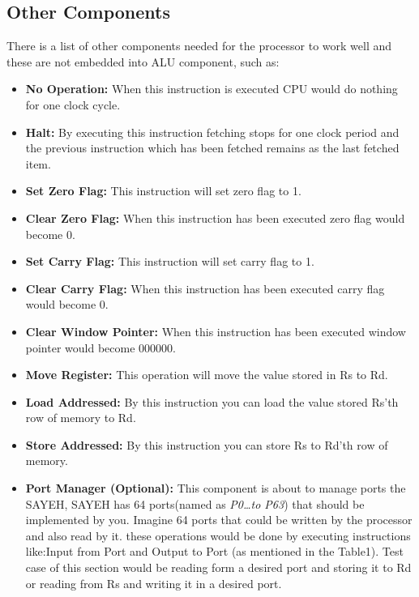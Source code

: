 \documentclass{report}
\begin{document}
    \subsection{Other Components}
        There is a list of other components needed for the processor to work well and these 		are not embedded into ALU component, such as:
        \begin{itemize}
            \item \textbf{No Operation:}
                When this instruction is executed CPU would do nothing for one clock cycle.
            \item \textbf{Halt:}
                By executing this instruction fetching stops for one clock period and the 				previous instruction which has been fetched remains as the last fetched item.
            \item \textbf{Set Zero Flag:}
                This instruction will set zero flag to 1.
            \item \textbf{Clear Zero Flag:}
                When this instruction has been executed zero flag would become 0.
            \item \textbf{Set Carry Flag:}
                This instruction will set carry flag to 1.
            \item \textbf{Clear Carry Flag:}
                When this instruction has been executed carry flag would become 0.
            \item \textbf{Clear Window Pointer:}
                When this instruction has been executed window pointer would become 000000.
            \item \textbf{Move Register:}
                This operation will move the value stored in Rs to Rd.
            \item \textbf{Load Addressed:}
                By this instruction you can load the value stored Rs’th row of memory to Rd.
            \item \textbf{Store Addressed:}
                By this instruction you can store Rs to Rd’th row of memory.
            \item \textbf{Port Manager (Optional):} This component is about to manage ports the SAYEH, SAYEH has 64 ports(named as \textit{P0\ldots to P63}) that should be implemented by you.
		    Imagine 64 ports that could be written by the processor and also read by it. these operations would be done by executing instructions like:Input from Port and Output to Port (as mentioned in the Table1).
		    Test case of this section would be reading form a desired port and storing it to Rd or reading from Rs and writing it in a desired port.

\end{itemize}
\end{document}
